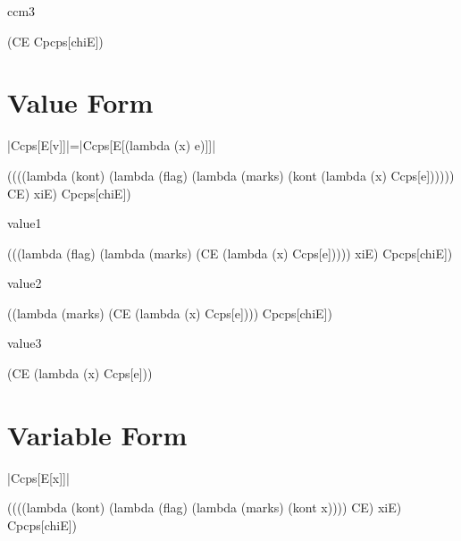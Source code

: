 \noindent
ccm3

\begin{schemeblock}
\begin{schemedisplay}
(CE Cpcps[chiE])
\end{schemedisplay}
\end{schemeblock}

\section{Value Form}

\noindent
\scheme|Ccps[E[v]]|=\scheme|Ccps[E[(lambda (x) e)]]|

\begin{schemeblock}
\begin{schemedisplay}
((((lambda (kont)
     (lambda (flag)
       (lambda (marks)
         (kont (lambda (x) Ccps[e])))))
   CE) xiE) Cpcps[chiE])
\end{schemedisplay}
\end{schemeblock}

\noindent
value1

\begin{schemeblock}
\begin{schemedisplay}
(((lambda (flag)
    (lambda (marks)
      (CE (lambda (x) Ccps[e]))))
  xiE) Cpcps[chiE])
\end{schemedisplay}
\end{schemeblock}

\noindent
value2

\begin{schemeblock}
\begin{schemedisplay}
((lambda (marks)
   (CE (lambda (x) Ccps[e])))
 Cpcps[chiE])
\end{schemedisplay}
\end{schemeblock}

\noindent
value3

\begin{schemeblock}
\begin{schemedisplay}
(CE (lambda (x) Ccps[e]))
\end{schemedisplay}
\end{schemeblock}

\section{Variable Form}

\noindent
\scheme|Ccps[E[x]]|
\begin{schemeblock}
\begin{schemedisplay}
((((lambda (kont)
     (lambda (flag)
       (lambda (marks)
         (kont x))))
   CE) xiE) Cpcps[chiE])
\end{schemedisplay}
\end{schemeblock}

